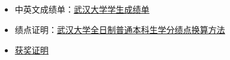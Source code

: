 \documentclass[letterpaper,AutoFakeBold]{twentysecondcv} %
\begin{document}
\begin{CJK*}{UTF8}{gbsn}

\vspace{250pt}
\profilesection{}

\begin{CJK*}{UTF8}{gkai}
\section{}
\end{CJK*}

\begin{itemize}
	\setlength{\itemsep}{0pt}
	\setlength{\parsep}{0pt}
	\setlength{\parskip}{0pt}
	\item 中英文成绩单：\href{https://raw.githubusercontent.com/RMSnow/CV/master/materials/AcademicTranscript.jpg}
	{武汉大学学生成绩单}
	\item 绩点证明：\href{https://raw.githubusercontent.com/RMSnow/CV/master/materials/GPA.jpg}
	{武汉大学全日制普通本科生学分绩点换算方法}
	\item \href{https://github.com/RMSnow/CV/blob/master/materials/XueyaoZhang_Awards.pdf}
	{获奖证明}
\end{itemize}








\end{CJK*}
\end{document}
